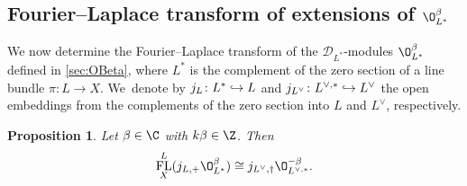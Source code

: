 \documentclass[JEP,XML,SOM,Unicode,published]{cedram}
\newcommand\hto{\mathrel{\lhook\joinrel\to}}
\newtheorem{prop}[thm]{Proposition}
\DeclareMathOperator{\FL}{\textup{FL}}
\begin{document}
\subsection{Fourier--Laplace transform of extensions of \texorpdfstring{$\O_{L^{*}}^\beta$}{O\_\{L\textasciicircum*\}\textasciicircum\textbackslash beta}}

We now determine the Fourier--Laplace transform of the $\mathscr{D}_{L^*}$\nobreakdash-mod\-ules $\O_{L^*}^\beta$ defined in \cref{sec:OBeta}, where $L^*$ is the complement of the zero section of a line bundle $\pi \colon L \to X$. We~denote by $j_L \colon L^* \hto L$ and $j_{L^\vee} \colon L^{\vee,*} \hto L^\vee$ the open embeddings from the complements of the zero section into $L$ and $L^\vee$, respectively.

\begin{prop} \label{prop:FLofObeta}
Let $\beta \in \C$ with $k\beta \in \Z$. Then
\[
\FL_X^{L}(j_{L,+} \O_{L^{*}}^{\beta}) \cong j_{L^\vee,\dag} \O_{L^{\vee,*}}^{-\beta}.
\]
\end{prop}
\end{document}
